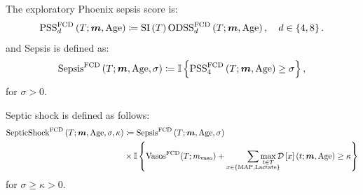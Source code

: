 \documentclass[letterpaper,10pt]{article}
\begin{document}
The exploratory Phoenix sepsis score is:
\begin{equation}
  \label{eq:pss-fcd}
  \PSS{d}[FCD] \coloneqq \SI \ODSS{d}[FCD], \quad d \in \left\{4, 8\right\}.
\end{equation}
and Sepsis is defined as:
\begin{equation}
  \label{eq:sepsis-fcd}
  \Sepsis[FCD] \coloneqq \mathbb{I} \left\{\PSS{4}[FCD]\geq \sigma \right\},
\end{equation}
for $\sigma > 0.$

Septic shock is defined as follows:
\begin{equation}
  \label{eq:septicshock-fcd}
  \begin{split}
    \SepticShock[FCD] &\coloneqq \Sepsis[FCD] \\ & \times
    \mathbb{I} \left\{
        \mathrm{Vasos}^{\mathrm{FCD}}(T;\m{vaso}) +
        \smashoperator[r]{\sum_{x \in \left\{\mathrm{MAP}, \mathrm{Lactate}\right\}}}
        \maxtinT \DS*{x}
      \geq \kappa
    \right\}
  \end{split}
\end{equation}
for $\sigma \geq \kappa > 0.$


%
%
%
%
%



\end{document}
